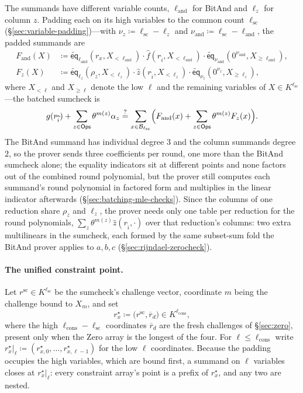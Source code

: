 \documentclass{article}
\theoremstyle{definition}
\newcommand*{\mle}{\widetilde}
\newcommand{\eq}{\mathsf{eq}}
\newcommand{\BB}{\mathcal{B}}
\begin{document}
The summands have different variable counts, $\ell_\text{and}$ for BitAnd and $\ell_z$ for column $z$. Padding each on its high variables to the common count $\ell_\text{sc}$ (\S\ref{sec:variable-padding})---with $\nu_z \coloneqq \ell_\text{sc} - \ell_z$ and $\nu_\text{and} \coloneqq \ell_\text{sc} - \ell_\text{and}$, the padded summands are
\begin{align*}
  F_\text{and}(X) &\coloneqq \mle{\eq}_{\ell_\text{and}}(r_x, X_{< \ell_\text{and}}) \cdot \widehat{f}(r_{\widehat{i}}, X_{< \ell_\text{and}}) \cdot \mle{\eq}_{\nu_\text{and}}(0^{\nu_\text{and}}, X_{\geq \ell_\text{and}}), \\
  F_z(X) &\coloneqq \mle{\eq}_{\ell_z}(\rho_z, X_{< \ell_z}) \cdot \widehat{z}(r_{\widehat{i}}, X_{< \ell_z}) \cdot \mle{\eq}_{\nu_z}(0^{\nu_z}, X_{\geq \ell_z}),
\end{align*}
where $X_{< \ell}$ and $X_{\geq \ell}$ denote the low $\ell$ and the remaining variables of $X \in K^{\ell_\text{sc}}$---the batched sumcheck is
\[
  g(r_{\widehat{i}}) + \sum_{z \in \textsf{Ops}} \theta^{m(z)} \alpha_z \stackrel{?}{=} \sum_{x \in \BB_{\ell_\text{sc}}} \Bigl( F_\text{and}(x) + \sum_{z \in \textsf{Ops}} \theta^{m(z)} F_z(x) \Bigr).
\]
The BitAnd summand has individual degree $3$ and the column summands degree $2$, so the prover sends three coefficients per round, one more than the BitAnd sumcheck alone; the equality indicators sit at different points and none factors out of the combined round polynomial, but the prover still computes each summand's round polynomial in factored form and multiplies in the linear indicator afterwards (\S\ref{sec:batching-mle-checks}). Since the columns of one reduction share $\rho_z$ and $\ell_z$, the prover needs only one table per reduction for the round polynomials, $\sum_z \theta^{m(z)} \widehat{z}(r_{\widehat{i}}, \cdot)$ over that reduction's columns: two extra multilinears in the sumcheck, each formed by the same subset-sum fold the BitAnd prover applies to $a, b, c$ (\S\ref{sec:rijndael-zerocheck}).

\paragraph{The unified constraint point.}
Let $r^\text{sc} \in K^{\ell_\text{sc}}$ be the sumcheck's challenge vector, coordinate $m$ being the challenge bound to $X_m$, and set
\[
  r^\star_x \coloneqq \bigl( r^\text{sc}, \overline{r}_d \bigr) \in K^{\ell_\text{cons}},
\]
where the high $\ell_\text{cons} - \ell_\text{sc}$ coordinates $\overline{r}_d$ are the fresh challenges of \S\ref{sec:zero}, present only when the Zero array is the longest of the four. For $\ell \leq \ell_\text{cons}$ write $r^\star_x|_\ell \coloneqq (r^\star_{x, 0}, \ldots, r^\star_{x, \ell - 1})$ for the low $\ell$ coordinates. Because the padding occupies the high variables, which are bound first, a summand on $\ell$ variables closes at $r^\star_x|_\ell$: every constraint array's point is a prefix of $r^\star_x$, and any two are nested.
\end{document}
